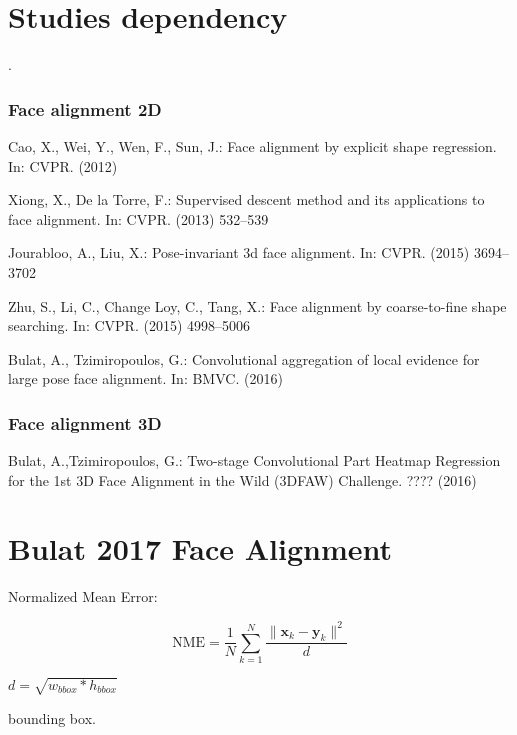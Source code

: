 \documentclass[11pt, a4paper, oneside]{article}
\begin{document}
\title{}
\author{}
\date{}


\part*{Studies dependency}.

\section*{Face alignment 2D}

Cao, X., Wei, Y., Wen, F., Sun, J.: Face alignment by explicit shape regression. In: CVPR. (2012)

Xiong, X., De la Torre, F.: Supervised descent method and its applications to face alignment. In: CVPR. (2013) 532–539

Jourabloo, A., Liu, X.: Pose-invariant 3d face alignment. In: CVPR. (2015) 3694–3702

Zhu, S., Li, C., Change Loy, C., Tang, X.: Face alignment by coarse-to-fine shape searching. In: CVPR. (2015) 4998–5006

Bulat, A., Tzimiropoulos, G.: Convolutional aggregation of local evidence for large pose face alignment. In: BMVC. (2016)

\section*{Face alignment 3D}

Bulat, A.,Tzimiropoulos, G.: Two-stage Convolutional Part Heatmap Regression for the 1st 3D Face Alignment in the Wild (3DFAW) Challenge. ???? (2016)


\part*{Bulat 2017 Face Alignment}

\noindent
Normalized Mean Error:

\begin{equation}
\text{NME}
= \frac{1}{N} \sum_{k=1}^N \frac{\| \mathbf{x}_k - \mathbf{y}_k \|^2}{d}
\tag{}
\end{equation}

\begin{description}[labelwidth=\widthof{\bfseries 123456789012345},align=parright]
	\item[Input variable: ]	$d = \sqrt{w_{ \mathit{bbox}} * h_{\mathit{bbox}} }$
	\item[$\mathit{bbox}:$] bounding box.
\end{description}
\end{document}

